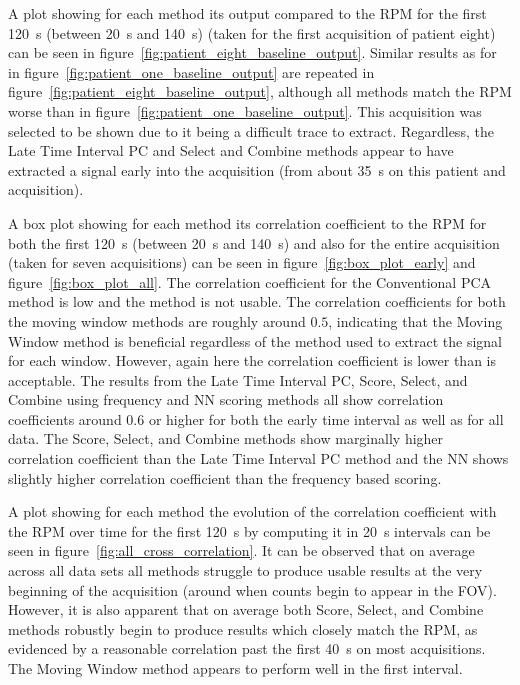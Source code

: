     A plot showing for each method its output compared to the \gls{RPM} for the first \SI{120}{\second} (between \SI{20}{\second} and \SI{140}{\second}) (taken for the first acquisition of patient eight) can be seen in figure~\ref{fig:patient_eight_baseline_output}. Similar results as for in figure~\ref{fig:patient_one_baseline_output} are repeated in figure~\ref{fig:patient_eight_baseline_output}, although all methods match the \gls{RPM} worse than in figure~\ref{fig:patient_one_baseline_output}. This acquisition was selected to be shown due to it being a difficult trace to extract. Regardless, the Late Time Interval \gls{PC} and Select and Combine methods appear to have extracted a signal early into the acquisition (from about \SI{35}{\second} on this patient and acquisition).
    
    A box plot showing for each method its correlation coefficient to the \gls{RPM} for both the first \SI{120}{\second} (between \SI{20}{\second} and \SI{140}{\second}) and also for the entire acquisition (taken for seven acquisitions) can be seen in figure~\ref{fig:box_plot_early} and figure~\ref{fig:box_plot_all}. The correlation coefficient for the Conventional \gls{PCA} method is low and the method is not usable. The correlation coefficients for both the moving window methods are roughly around $0.5$, indicating  that the Moving Window method is beneficial regardless of the method used to extract the signal for each window. However, again here the correlation coefficient is lower than is acceptable. The results from the Late Time Interval \gls{PC}, Score, Select, and Combine using frequency and \gls{NN} scoring methods all show correlation coefficients around $0.6$ or higher for both the early time interval as well as for all data. The Score, Select, and Combine methods show marginally higher correlation coefficient than the Late Time Interval \gls{PC} method and the \gls{NN} shows slightly higher correlation coefficient than the frequency based scoring.
    
    A plot showing for each method the evolution of the correlation coefficient with the \gls{RPM} over time for the first \SI{120}{\second} by computing it in \SI{20}{\second} intervals can be seen in figure~\ref{fig:all_cross_correlation}. It can be observed that on average across all data sets all methods struggle to produce usable results at the very beginning of the acquisition (around when counts begin to appear in the \gls{FOV}). However, it is also apparent that on average both Score, Select, and Combine methods robustly begin to produce results which closely match the \gls{RPM}, as evidenced by a reasonable correlation past the first \SI{40}{\second} on most acquisitions. The Moving Window method appears to perform well in the first interval.
    
